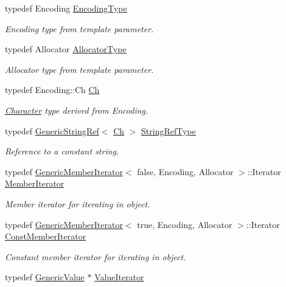 \begin{DoxyCompactItemize}
typedef Encoding \hyperlink{classGenericValue_a28c2cb8d04d12566c1af37597a46d209}{Encoding\+Type}
\begin{DoxyCompactList}\small\item\em Encoding type from template parameter. \end{DoxyCompactList}\item 
typedef Allocator \hyperlink{classGenericValue_a7beb83860c1b8d2a0e2a7da9796b2fa1}{Allocator\+Type}
\begin{DoxyCompactList}\small\item\em Allocator type from template parameter. \end{DoxyCompactList}\item 
typedef Encoding\+::\+Ch \hyperlink{classGenericValue_ade0e0ce64ccd5d852da57a35e720bafb}{Ch}
\begin{DoxyCompactList}\small\item\em \hyperlink{structCharacter}{Character} type derived from Encoding. \end{DoxyCompactList}\item 
typedef \hyperlink{structGenericStringRef}{Generic\+String\+Ref}$<$ \hyperlink{classGenericValue_ade0e0ce64ccd5d852da57a35e720bafb}{Ch} $>$ \hyperlink{classGenericValue_a32e0f30ee278072374c8168b14d3317f}{String\+Ref\+Type}
\begin{DoxyCompactList}\small\item\em Reference to a constant string. \end{DoxyCompactList}\item 
typedef \hyperlink{classGenericMemberIterator}{Generic\+Member\+Iterator}$<$ false, Encoding, Allocator $>$\+::Iterator \hyperlink{classGenericValue_a349b8faae61edc42b4289726820be439}{Member\+Iterator}
\begin{DoxyCompactList}\small\item\em Member iterator for iterating in object. \end{DoxyCompactList}\item 
typedef \hyperlink{classGenericMemberIterator}{Generic\+Member\+Iterator}$<$ true, Encoding, Allocator $>$\+::Iterator \hyperlink{classGenericValue_aac08c3e660a9036d3dcb8b10ff6c61f4}{Const\+Member\+Iterator}
\begin{DoxyCompactList}\small\item\em Constant member iterator for iterating in object. \end{DoxyCompactList}\item 
typedef \hyperlink{classGenericValue}{Generic\+Value} $\ast$ \hyperlink{classGenericValue_aee30721a49688ba0f865f5d581eb6be9}{Value\+Iterator}

\end{DoxyCompactItemize}
